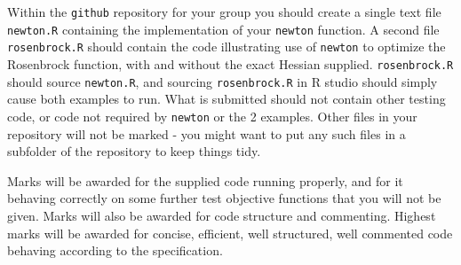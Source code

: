 \documentclass[10pt] {article}
\begin{document}
\bigskip

 Within the {\tt github} repository for your group you should create a single text file {\tt newton.R} containing the implementation of your {\tt newton} function.  A second file {\tt rosenbrock.R} should contain the code illustrating use of {\tt newton} to optimize the Rosenbrock function, with and without the exact Hessian supplied. {\tt rosenbrock.R} should source {\tt newton.R}, and sourcing {\tt rosenbrock.R}
in R studio should simply cause both examples to run. What is submitted should not contain other testing code, or code not required by {\tt newton} or the 2 examples. Other files in your repository will not be marked - you might want to put any such files in a subfolder of the repository to keep things tidy. 
\bigskip 

 Marks will be awarded for the supplied code running properly, and for it behaving correctly on some further test objective functions that you will not be given. Marks will also be awarded for code structure and commenting. Highest marks will be awarded for concise, efficient, well structured, well commented code behaving according to the specification. 
\end{document}

